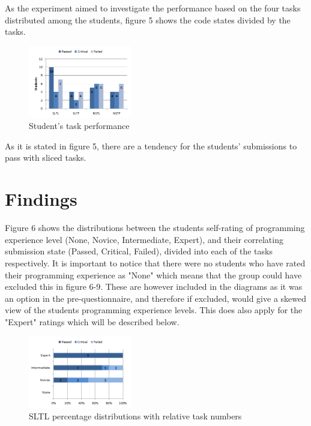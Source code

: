 \documentclass{sig-alternate-05-2015}
\begin{document}
As the experiment aimed to investigate the performance based on the four tasks distributed among the students, figure 5 shows the code states divided by the tasks.

\begin{figure}[H]
	\centering
	\includegraphics[width=0.4\textwidth]{img05}
	\caption{Student's task performance}
\end{figure}

As it is stated in figure 5, there are a tendency for the students' submissions to pass with sliced tasks.

\section{Findings}

Figure 6 shows the distributions between the students self-rating of programming experience level (None, Novice, Intermediate, Expert), and their correlating submission state (Passed, Critical, Failed), divided into each of the tasks respectively.
It is important to notice that there were no students who have rated their programming experience  as "None" which means that the group could have excluded this in figure 6-9. These are however included in the diagrams as it was an option in the pre-questionnaire, and therefore if excluded, would give a skewed view of the students programming experience levels. This does also apply for the "Expert" ratings which will be described below.

\begin{figure}[H]
	\centering
	\includegraphics[width=0.4\textwidth]{img06}
	\caption{SLTL percentage distributions with relative task numbers}
\end{figure}
\end{document}
